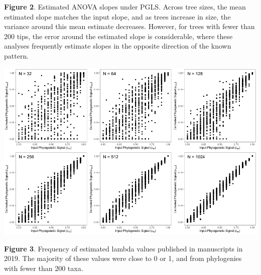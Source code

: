 \documentclass[]{article}
\begin{document}
\singlespacing \textbf{Figure 2}. Estimated ANOVA slopes under PGLS.
Across tree sizes, the mean estimated slope matches the input slope, and
as trees increase in size, the variance around this mean estimate
decreases. However, for trees with fewer than 200 tips, the error around
the estimated slope is considerable, where these analyses frequently
estimate slopes in the opposite direction of the known pattern.
\hfill\break

\newpage

\includegraphics[width=0.95\linewidth]{Fig3}

\singlespacing \textbf{Figure 3}. Frequency of estimated lambda values
published in manuscripts in 2019. The majority of these values were
close to 0 or 1, and from phylogenies with fewer than 200 taxa.
\end{document}
